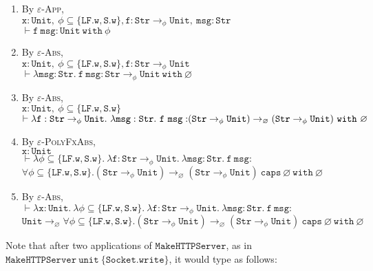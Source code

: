 \documentclass{llncs}
\newcommand{\keywadj}[1]{\mathtt{#1}}
\newcommand{\keyw}[1]{\keywadj{#1}~}
\newcommand{\kw}[1]{\keyw{ #1 }}
\newcommand{\kwa}[1]{\keywadj{ #1 }}
\newcommand{\polycap}[3]{
	\forall #1. #2~ \kw{caps} #3
}
\begin{document}
\begin{enumerate}
	\item By \textsc{$\varepsilon$-App}, \\
	$\kwa{x: Unit,~ \phi \subseteq \{LF.w, S.w\}, f: Str \rightarrow_{\phi} Unit,~ msg: Str}$ \\
	$\vdash \kwa{f~msg: Unit~\kw{with} \phi}$
	
	\item By \textsc{$\varepsilon$-Abs}, \\
	$\kwa{x: Unit,~ \phi \subseteq \{LF.w, S.w\}, f: Str \rightarrow_{\phi} Unit}$ \\
	$\vdash \kwa{\lambda msg: Str.~f~msg: Str \rightarrow_{\phi} Unit~\kw{with} \varnothing }$

	\item By \textsc{$\varepsilon$-Abs}, \\
	$\kwa{x: Unit,~ \phi \subseteq \{LF.w, S.w\}}$ \\
	$\vdash \kwa{\lambda f: Str \rightarrow_{\phi} Unit.~\lambda msg: Str.~f~msg:}\\
	\kwa{ (Str \rightarrow_{\phi} Unit) \rightarrow_{\varnothing} (Str \rightarrow_{\phi} Unit)~\kw{with} \varnothing }$

	\item By \textsc{$\varepsilon$-PolyFxAbs}, \\
	$\kwa{x: Unit}$ \\
	$\vdash \kwa{\lambda \phi \subseteq \{ LF.w, S.w \}.~ \lambda f: Str \rightarrow_{\phi} Unit.~\lambda msg: Str.~f~msg:}$\\
	$\kwa{\polycap{\phi \subseteq \{ LF.w, S.w\}}{(Str \rightarrow_{\phi} Unit) \rightarrow_{\varnothing} (Str \rightarrow_{\phi} Unit)}{\varnothing}~\kw{with} \varnothing}$

	\item By \textsc{$\varepsilon$-Abs}, \\
	$\vdash \kwa{\lambda x: Unit. ~\lambda \phi \subseteq \{ LF.w, S.w \}.~ \lambda f: Str \rightarrow_{\phi} Unit.~\lambda msg: Str.~f~msg:}$\\
	$\kwa{Unit} \rightarrow_{\varnothing} \kwa{\polycap{\phi \subseteq \{ LF.w, S.w\}}{(Str \rightarrow_{\phi} Unit) \rightarrow_{\varnothing} (Str \rightarrow_{\phi} Unit)}{\varnothing}~\kw{with} \varnothing}$
\end{enumerate}

\noindent
Note that after two applications of $\kwa{MakeHTTPServer}$, as in $\kwa{MakeHTTPServer~unit~\{Socket.write\}}$, it would type as follows:
\end{document}
